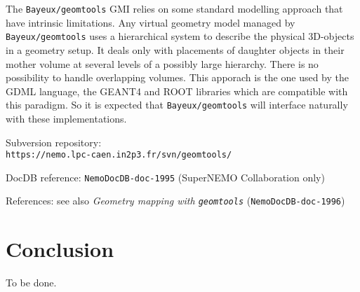 \documentclass[a4paper,12pt]{article}
\newcommand{\pn}{\par\noindent}
\begin{document}
\pn  The   \texttt{Bayeux/geomtools}  GMI  relies  on   some  standard
modelling  approach  that  have  intrinsic  limitations.  Any  virtual
geometry  model  managed  by \texttt{Bayeux/geomtools}  uses  a  hierarchical
system to  describe the physical  3D-objects in a geometry  setup.  It
deals only with  placements of daughter objects in  their mother volume
at  several  levels  of  a  possibly large  hierarchy.   There  is  no
possibility to handle overlapping volumes.
This apporach  is the one used by the GDML language, the GEANT4
 and ROOT libraries which are compatible with this  paradigm.
So it  is expected that  \texttt{Bayeux/geomtools} will
interface naturally with these implementations.

\vskip 5mm
\pn
Subversion repository:\\
\texttt{https://nemo.lpc-caen.in2p3.fr/svn/geomtools/}
\pn
DocDB reference: \texttt{NemoDocDB-doc-1995} (SuperNEMO Collaboration only)
\pn
References: see also
\textit{Geometry mapping with \texttt{geomtools}} (\texttt{NemoDocDB-doc-1996})
\pagebreak



\clearpage


\clearpage

\section{Conclusion}

\pn To be done.
\end{document}
